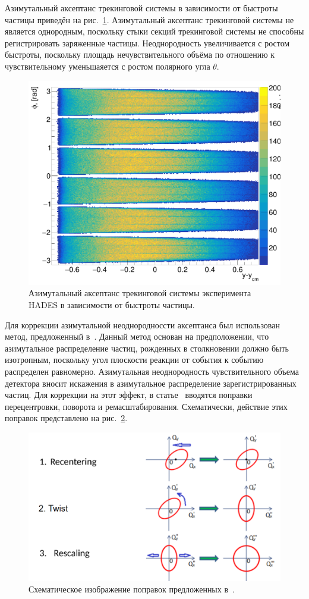 Азимутальный аксептанс трекинговой системы в зависимости от быстроты частицы приведён на рис.~\ref{fig:hades_phi_y}.
Азимутальный аксептанс трекинговой системы не является однородным, поскольку стыки секций трекинговой системы не способны регистрировать заряженные частицы.
Неоднородность увеличивается с ростом быстроты, поскольку площадь нечувствительного объёма по отношению к чувствительному уменьшаяется с ростом полярного угла $\theta$. 
%
\begin{figure}[ht]
\begin{center}
\includegraphics[width=0.55\linewidth]{images/hades_phi_y.png}
\caption{Азимутальный аксептанс трекинговой системы эксперимента HADES в зависимости от быстроты частицы.}
\label{fig:hades_phi_y}
\end{center}
\end{figure}

Для коррекции азимутальной неоднородноссти аксептанса был использован метод, предложенный в~\cite{Selyuzhenkov:2007zi}.
Данный метод основан на предположении, что азимутальное распределение частиц, рожденных в столкновении должно быть изотропным, поскольку угол плоскости реакции от события к событию распределен равномерно.
Азимутальная неоднородность чувствительного объема детектора вносит искажения в азимутальное распределение зарегистрированных частиц. 
Для коррекции на этот эффект, в статье~\cite{Selyuzhenkov:2007zi} вводятся поправки перецентровки, поворота и ремасштабирования. 
Схематически, действие этих поправок представлено на рис.~\ref{fig:qn_corrections}.
%
\begin{figure}[ht]
\begin{center}
\includegraphics[width=0.75\linewidth]{images/qntools_corrections.png}
\caption{Схематическое изображение поправок предложенных в~\cite{Selyuzhenkov:2007zi}.}
\label{fig:qn_corrections}
\end{center}
\end{figure}
%

